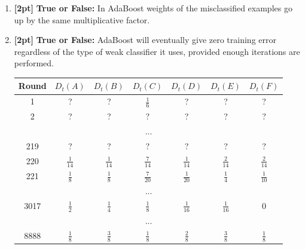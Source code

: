 \documentclass[11pt,addpoints,answers]{exam}
\renewcommand{\circle}{\tikz\draw[black] (0,0) circle (1ex);}
\begin{document}
\begin{enumerate}
 \item \textbf{[2pt]} 
    \textbf{True or False:} In AdaBoost weights of the misclassified examples go up by the same multiplicative factor.

    


 \item \textbf{[2pt]} 
    \textbf{True or False:} AdaBoost will eventually give zero training error regardless of the type of weak classifier it uses, provided enough iterations are performed.

    

\begin{table}[h]
\begin{center}
\begin{tabular}{ |c|c|c|c|c|c|c| } 
 \hline
 Round & $D_t(A)$ & $D_t(B)$ & $D_t(C)$ & $D_t(D)$ & $D_t(E)$ & $D_t(F)$ \\ [4pt]
  \hline
  \hline
 1 & ? & ? & $\frac{1}{6}$ & ? & ? & ? \\ [4pt]
  \hline
 2 & ? & ? & ? & ? & ? & ? \\ [4pt]
 \hline
\multicolumn{7}{|c|}{...}\\[4pt]
 \hline
 219 & ? & ? & ? & ? & ? & ? \\ [4pt]
  \hline 220 & $\frac{1}{14}$ & $\frac{1}{14}$ & $\frac{7}{14}$ & $\frac{1}{14}$ & $\frac{2}{14}$ & $\frac{2}{14}$ \\ [4pt]
   \hline
 221 & $\frac{1}{8}$ & $\frac{1}{8}$ & $\frac{7}{20}$ & $\frac{1}{20}$ & $\frac{1}{4}$ & $\frac{1}{10}$ \\ [4pt]
  \hline
\multicolumn{7}{|c|}{...}\\[4pt]
 \hline
  3017 & $\frac{1}{2}$ & $\frac{1}{4}$ & $\frac{1}{8}$ & $\frac{1}{16}$ & $\frac{1}{16}$ & 0 \\ [4pt]
   \hline
\multicolumn{7}{|c|}{...}\\[4pt]
 \hline
  8888 & $\frac{1}{8}$ & $\frac{3}{8}$ & $\frac{1}{8}$ & $\frac{2}{8}$ & $\frac{3}{8}$ & $\frac{1}{8}$ \\ [4pt]
   \hline
\end{tabular}
\end{center}
\end{table}  


\end{enumerate}
\end{document}

